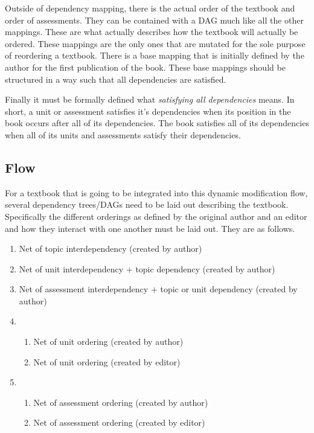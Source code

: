Outside of dependency mapping, there is the actual order of the textbook and order of assessments. They can be contained with a DAG much like all the other mappings. These are what actually describes how the textbook will actually be ordered. These mappings are the only ones that are mutated for the sole purpose of reordering a textbook. There is a base mapping that is initially defined by the author for the first publication of the book. These base mappings should be structured in a way such that all dependencies are satisfied.

Finally it must be formally defined what \textit{satisfying all dependencies} means. In short, a unit or assessment satisfies it's dependencies when its position in the book occurs after all of its dependencies. The book satisfies all of its dependencies when all of its units and assessments satisfy their dependencies.

\subsection{Flow}

For a textbook that is going to be integrated into this dynamic modification flow, several dependency trees/DAGs need to be laid out describing the textbook. Specifically the different orderings as defined by the original author and an editor and how they interact with one another must be laid out. They are as follows.

\begin{enumerate}
    \item Net of topic interdependency (created by author)
    \item Net of unit interdependency $+$ topic dependency (created by author)
    \item Net of assessment interdependency $+$ topic or unit dependency (created by author)
    \item \begin{enumerate}
        \item Net of unit ordering (created by author)
        \item Net of unit ordering (created by editor)
    \end{enumerate}
    \item \begin{enumerate}
        \item Net of assessment ordering (created by author)
        \item Net of assessment ordering (created by editor)
    \end{enumerate}
\end{enumerate}

